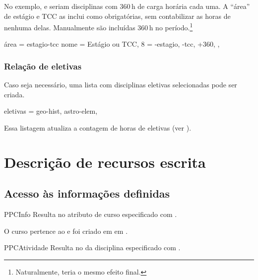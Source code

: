 \documentclass[a4paper, 11pt]{article}
\begin{document}
No exemplo,  e  seriam disciplinas com 360\,h de carga horária cada uma. A ``área'' de estágio e TCC as inclui como obrigatórias, sem contabilizar as horas de nenhuma delas. Manualmente são incluídas 360\,h no período.\footnote{Naturalmente,  teria o mesmo efeito final.}

\begin{PDListing}
    área = {estagio-tcc}{
        nome = {Estágio ou TCC},
        8 = {-estagio, -tcc, +360},
    },
\end{PDListing}

\subsubsection{Relação de eletivas}

Caso seja necessário, uma lista com disciplinas eletivas selecionadas pode ser criada.

\begin{PDListing}
    eletivas = {geo-hist, astro-elem},
\end{PDListing}

Essa listagem atualiza a contagem de horas de eletivas (ver ).


\section{Descrição de recursos escrita}

\subsection{Acesso às informações definidas}

\begin{Macrodef}{PPCInfo}{}{}
    Resulta no atributo de curso especificado com .
\end{Macrodef}

\begin{PDExample}
    O curso pertence ao  e foi criado em em .
\end{PDExample}

\begin{Macrodef}{PPCAtividade}{}{}
    Resulta no  da disciplina  especificado com .
\end{Macrodef}
\end{document}
